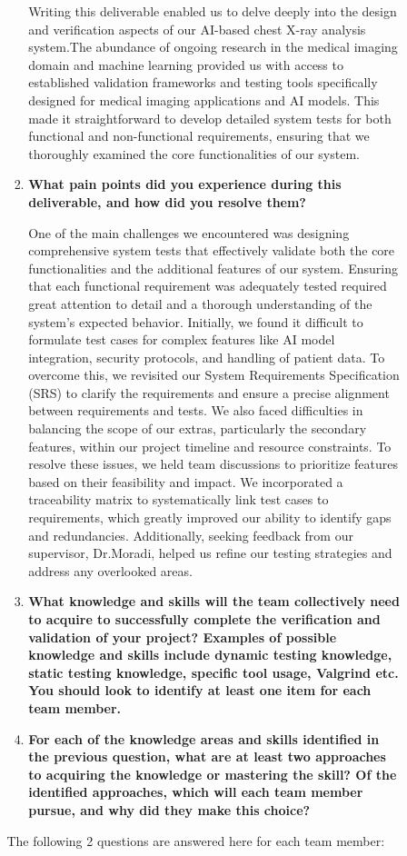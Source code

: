 \documentclass[12pt, titlepage]{article}
\begin{document}
\begin{enumerate}
\begin{enumerate}
\begin{enumerate}
\begin{enumerate}
  Writing this deliverable enabled us to delve deeply into the design and verification aspects of our AI-based chest X-ray analysis system.The abundance of ongoing research in the medical imaging domain and machine learning provided us with access to established validation frameworks and testing tools specifically designed for medical imaging applications and AI models. This made it straightforward to develop detailed system tests for both functional and non-functional requirements, ensuring that we thoroughly examined the core functionalities of our system.
  \item \textbf{What pain points did you experience during this deliverable, and how
    did you resolve them?}
    
  One of the main challenges we encountered was designing comprehensive system tests that effectively validate both the core functionalities and the additional features of our system. Ensuring that each functional requirement was adequately tested required great attention to detail and a thorough understanding of the system's expected behavior. Initially, we found it difficult to formulate test cases for complex features like AI model integration, security protocols, and handling of patient data. To overcome this, we revisited our System Requirements Specification (SRS) to clarify the requirements and ensure a precise alignment between requirements and tests. We also faced difficulties in balancing the scope of our extras, particularly the secondary features, within our project timeline and resource constraints. To resolve these issues, we held team discussions to prioritize features based on their feasibility and impact. We incorporated a traceability matrix to systematically link test cases to requirements, which greatly improved our ability to identify gaps and redundancies. Additionally, seeking feedback from our supervisor, Dr.Moradi, helped us refine our testing strategies and address any overlooked areas. 
  \item \textbf{What knowledge and skills will the team collectively need to acquire to
  successfully complete the verification and validation of your project?
  Examples of possible knowledge and skills include dynamic testing knowledge,
  static testing knowledge, specific tool usage, Valgrind etc.  You should look to
  identify at least one item for each team member.}

  \item \textbf{For each of the knowledge areas and skills identified in the previous
  question, what are at least two approaches to acquiring the knowledge or
  mastering the skill?  Of the identified approaches, which will each team
  member pursue, and why did they make this choice?}
\end{enumerate}
The following 2 questions are answered here for each team member:


\end{enumerate}
\end{enumerate}
\end{enumerate}
\end{document}
